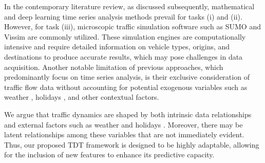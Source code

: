 In the contemporary literature review, as discussed subsequently, mathematical and deep learning time series analysis methods prevail for tasks (i) and (ii). However, for task (iii), microscopic traffic simulation software such as SUMO \cite{sumo} and Vissim \cite{vissim} are commonly utilized. These simulation engines are computationally intensive and require detailed information on vehicle types, origins, and destinations to produce accurate results, which may pose challenges in data acquisition. Another notable limitation of previous approaches, which predominantly focus on time series analysis, is their exclusive consideration of traffic flow data without accounting for potential exogenous variables such as weather \cite{weather}, holidays \cite{holiday}, and other contextual factors.

We argue that traffic dynamics are shaped by both intrinsic data relationships and external factors such as weather \cite{weather} and holidays \cite{holiday}. Moreover, there may be latent relationships among these variables that are not immediately evident. Thus, our proposed TDT framework is designed to be highly adaptable, allowing for the inclusion of new features to enhance its predictive capacity.

